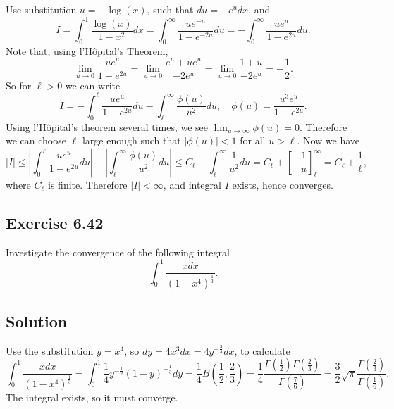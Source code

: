 Use substitution $u = -\log(x)$, such that $du = -e^{u}dx$, and
\begin{equation*}
    I = \int_0^1 \frac{\log(x)}{1 - x^2} dx
        = \int_0^{\infty} \frac{u e^{-u}}{1 - e^{-2u}} du
        = - \int_0^{\infty} \frac{u e^{u}}{1 - e^{2u}} du.
\end{equation*}
Note that, using l'H\^opital's Theorem,
\begin{equation*}
    \lim_{u \to 0} \frac{u e^{u}}{1 - e^{2u}}
        = \lim_{u \to 0} \frac{e^{u} + u e^{u}}{-2 e^{u}}
        = \lim_{u \to 0} \frac{1 + u}{-2e^u}
        = -\frac{1}{2}.
\end{equation*}
So for $\ell > 0$ we can write
\begin{equation*}
    I = -\int_0^{\ell} \frac{u e^{u}}{1 - e^{2u}} du - \int_{\ell}^{\infty} \frac{\phi(u)}{u^2} du,
        \quad \phi(u) = \frac{u^3 e^{u}}{1 - e^{2u}}.
\end{equation*}
Using l'H\^opital's theorem several times, we see $\lim_{u \to \infty} \phi(u) = 0$.
Therefore we can choose $\ell$ large enough such that $|\phi(u)| < 1$ for all $u > \ell$.
Now we have
\begin{equation*}
    |I| \leq \left| \int_0^{\ell} \frac{u e^u}{1 - e^{2u}} du \right|
            + \left| \int_{\ell}^{\infty} \frac{\phi(u)}{u^2} du \right|
        \leq C_{\ell} + \int_{\ell}^{\infty} \frac{1}{u^2} du
        = C_{\ell} + \left[ -\frac{1}{u} \right]_{\ell}^{\infty}
        = C_{\ell} + \frac{1}{\ell},
\end{equation*}
where $C_{\ell}$ is finite.
Therefore $|I| < \infty$, and integral $I$ exists, hence converges.


\subsection*{Exercise 6.42}

Investigate the convergence of the following integral
\begin{equation*}
    \int_0^1 \frac{x dx}{(1 - x^4)^{\frac{1}{3}}}.
\end{equation*}

\subsection*{Solution}

Use the substitution $y = x^4$, so $dy = 4 x^3 dx = 4 y^{-\frac{3}{4}} dx$, to calculate
\begin{equation*}
    \int_0^1 \frac{x dx}{(1 - x^4)^{\frac{1}{3}}}
        = \int_0^1 \frac{1}{4} y^{-\frac{1}{2}} (1 - y)^{-\frac{1}{3}} dy
        = \frac{1}{4} B(\frac{1}{2}, \frac{2}{3})
        = \frac{1}{4} \frac{\Gamma(\frac{1}{2}) \Gamma(\frac{2}{3})}{\Gamma(\frac{7}{6})}
        = \frac{3}{2} \sqrt{\pi} \frac{\Gamma(\frac{2}{3})}{\Gamma(\frac{1}{6})}.
\end{equation*}
The integral exists, so it must converge.

